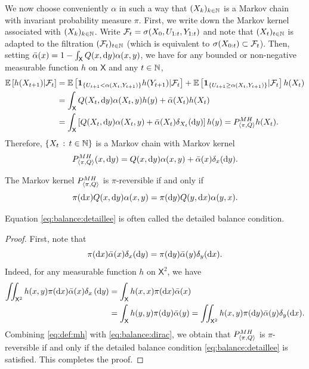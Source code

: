 \documentclass[english,graybox,envcountchap,envcountsame,sectrefs,shortlabels]{svmono}
\theoremstyle{style}
\newcommand{\Xset}{\mathsf{X}}
\begin{document}
We now choose conveniently $\alpha$ in such a way that $(X_{k})_{k\in\mathbb{N}}$
is a Markov chain with invariant probability measure $\pi$. 
First, we write down the Markov kernel associated with $(X_{k})_{k\in\mathbb{N}}$. Write $\mathcal{F}_{t}=\sigma(X_{0},U_{1:t},Y_{1:t})$
and note that $(X_{t})_{t\in\mathbb{N}}$ is adapted to the filtration $(\mathcal{F}_{t})_{t\in\mathbb{N}}$
(which is equivalent to $\sigma(X_{0:t})\subset\mathcal{F}_{t}$). Then,
setting $\bar{\alpha}(x)=1-\int_{\Xset}Q(x,\rmd y)\alpha(x,y)$, we
have for any bounded or non-negative measurable function $h$ on $\Xset$
and any $t\in\mathbb{N}$,
\begin{align*}
\PE\lrb{h(X_{t+1})|\mcf_{t}} & =\PE\lrb{\indiacc{U_{t+1}<\alpha(X_{t},Y_{t+1})}h(Y_{t+1})|\mcf_{t}}+\PE\lrb{\indiacc{U_{t+1}\geq\alpha(X_{t},Y_{t+1})}|\mcf_{t}}h(X_{t})\\
 & =\int_{\Xset}Q(X_{t},\rmd y)\alpha(X_{t},y)h(y)+\bar{\alpha}(X_{t})h(X_{t})\\
 & =\int_{\Xset}\lrb{Q(X_{t},\rmd y)\alpha(X_{t},y)+\bar{\alpha}(X_{t})\delta_{X_{t}}(\rmd y)}h(y)=\mh{\pi,Q}h(X_{t}).
\end{align*}
Therefore, $\left\{ X_{t}\,:\,t\in\mathbb{N}\right\}$ is a Markov chain with Markov
kernel
\begin{equation}
P_{\langle\pi,Q\rangle}^{MH}(x,\mathrm{d} y)=Q(x,\mathrm{d} y)\alpha(x,y)+\bar{\alpha}(x)\delta_{x}(\mathrm{d} y).\label{eq:def:mh}
\end{equation}

\begin{lemma}
\label{lem:reversible} The Markov kernel $P_{\langle\pi,Q\rangle}^{MH}$ is $\pi$-reversible
if and only if
\begin{equation}
\pi(\mathrm{d} x)Q(x,\mathrm{d} y)\alpha(x,y)=\pi(\mathrm{d} y)Q(y,\mathrm{d} x)\alpha(y,x).\label{eq:balance:detaillee}
\end{equation}
\end{lemma}
Equation \eqref{eq:balance:detaillee} is often called
the detailed balance condition.
\begin{proof}
First, note that
\begin{equation}
\pi(\mathrm{d} x)\bar{\alpha}(x)\delta_{x}(\mathrm{d} y)=\pi(\mathrm{d} y)\bar{\alpha}(y)\delta_{y}(\mathrm{d} x).\label{eq:balance:dirac}
\end{equation}
Indeed, for any measurable function $h$ on $\Xset^{2}$, we have
\begin{align*}
\iint_{\Xset^{2}}h(x,y)\pi(\rmd x)\bar{\alpha}(x)\delta_{x}\lr{\rmd y} & =\int_{\Xset}h(x,x)\pi(\rmd x)\bar{\alpha}(x)\\
 & =\int_{\Xset}h(y,y)\pi(\rmd y)\bar{\alpha}(y)=\iint_{\Xset^{2}}h(x,y)\pi(\rmd y)\bar{\alpha}(y)\delta_{y}(\rmd x).
\end{align*}
Combining \eqref{eq:def:mh} with \eqref{eq:balance:dirac}, we obtain that
$P_{\langle\pi,Q\rangle}^{MH}$ is $\pi$-reversible if and only if the detailed balance
condition \eqref{eq:balance:detaillee} is satisfied. This completes
the proof.
\end{proof}
\end{document}

